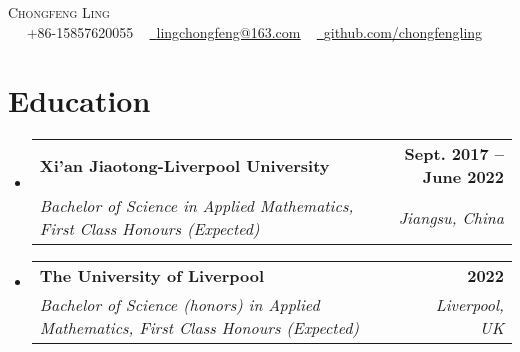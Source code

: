 \documentclass[letterpaper,11pt]{article}
\makeatletter
\newcommand{\resumeSubheading}[4]{
  \vspace{-2pt}\item
    \begin{tabular*}{1.0\textwidth}[t]{l@{\extracolsep{\fill}}r}
      \textbf{#1} & \textbf{\small #2} \\
      \textit{\small#3} & \textit{\small #4} \\
    \end{tabular*}\vspace{-7pt}
}
\newcommand{\resumeSubHeadingListStart}{\begin{itemize}[leftmargin=0.0in, label={}]}
\newcommand{\resumeSubHeadingListEnd}{\end{itemize}}
\makeatother
\begin{document}

\begin{center}
    {\Huge \scshape Chongfeng Ling} \\ \vspace{1pt} ~
    \small \raisebox{-0.1\height}\faPhone\ +86-15857620055 ~ \href{mailto:ling.chongfeng@outlook.com}{\raisebox{-0.2\height}\faEnvelope\  \underline{lingchongfeng@163.com}} ~ 
    \href{https://github.com/chongfengling}{\raisebox{-0.2\height}\faGithub\ \underline{github.com/chongfengling}}
    \vspace{-8pt}
\end{center}


\section{Education}
  \resumeSubHeadingListStart
    \resumeSubheading
      {Xi'an Jiaotong-Liverpool University}{Sept. 2017 -- June 2022}
      {Bachelor of Science in Applied Mathematics, First Class Honours (Expected)}{Jiangsu, China}

    \resumeSubheading
      {The University of Liverpool}{2022}
      {Bachelor of Science (honors) in Applied Mathematics, First Class Honours (Expected)}{Liverpool, UK}
  \resumeSubHeadingListEnd

\end{document}
